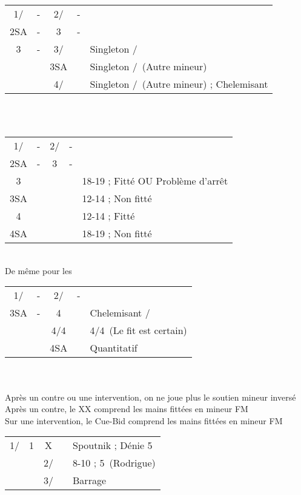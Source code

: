 \documentclass[a4paper, oneside, 11pt]{report}
\begin{document}
		\begin{tabular}{cccc|l}
		1\trefle/\carreau & - & 2\trefle/\carreau & - &\\
		2SA & - & 3\trefle & - &\\
		3\carreau & - & 3\coeur/\pique && Singleton \pique/\coeur\\	
		&& 3SA && Singleton \carreau/\trefle\ (Autre mineur)\\
		&& 4\trefle/\carreau && Singleton \carreau/\trefle\ (Autre mineur) ; Chelemisant\\
		\end{tabular}\\\\

		\begin{tabular}{cccc|l}
		1\trefle/\carreau & - & 2\trefle/\carreau & - &\\
		2SA & - & 3\carreau & - &\\
		3\coeur &&&& 18-19 ; Fitté OU Problème d'arrêt \pique\\
		3SA &&&& 12-14 ; Non fitté\\
		4\coeur &&&& 12-14 ; Fitté\\
		4SA &&&& 18-19 ; Non fitté\\
		\end{tabular}\\
		De même pour les \pique\\

		\begin{tabular}{cccc|l}
		1\trefle/\carreau & - & 2\trefle/\carreau & - &\\
		3SA & - & 4\trefle && Chelemisant \trefle/\carreau\\
		&& 4\carreau/4\coeur && 4\coeur/4\pique\ (Le fit est certain)\\
		&& 4SA && Quantitatif\\
		\end{tabular}\\\\

		Après un contre ou une intervention, on ne joue plus le soutien mineur inversé\\
		Après un contre, le XX comprend les mains fittées en mineur FM\\
		Sur une intervention, le Cue-Bid comprend les mains fittées en mineur FM\\
		
		\begin{tabular}{cccc|l}
		1\trefle/\carreau & 1\pique & X && Spoutnik ; Dénie 5\coeur\\
		&& 2\trefle/\carreau && 8-10 ; 5\coeur\ (Rodrigue)\\
		&& 3\trefle/\carreau && Barrage\\
		\end{tabular}\\\\
		
\end{document}
